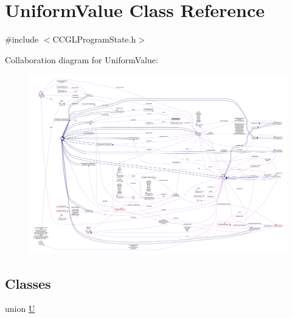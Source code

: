 \hypertarget{classUniformValue}{}\section{Uniform\+Value Class Reference}
\label{classUniformValue}


{\ttfamily \#include $<$C\+C\+G\+L\+Program\+State.\+h$>$}



Collaboration diagram for Uniform\+Value\+:
\nopagebreak
\begin{figure}[H]
\begin{center}
\leavevmode
\includegraphics[width=350pt]{classUniformValue__coll__graph}
\end{center}
\end{figure}
\subsection*{Classes}
\begin{DoxyCompactItemize}
\item 
union \hyperlink{unionUniformValue_1_1U}{U}
\end{DoxyCompactItemize}
